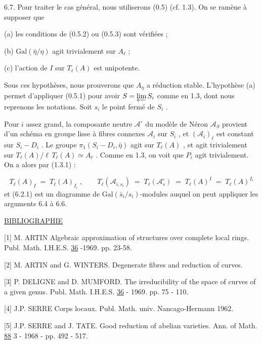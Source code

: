 6.7. Pour traiter le cas général, nous utiliserons (0.5) (cf. 1.3). On se ramène à supposer que



(a) les conditions de (0.5.2) ou (0.5.3)  sont vérifiées ;

(b) $\mathrm{Gal}(\bar{\eta}/\eta)$  agit trivialement sur  $A_\ell$ ;

(c) l'action de  $I$  sur  $T_\ell(A)$  est unipotente.

Sous ces hypothèses, nous prouverons que  $A_\eta$  a réduction stable. L'hypothèse (a) permet d'appliquer (0.5.1) pour avoir  $S = \varprojlim S_i$  comme en 1.3, dont nous reprenons les notations. Soit  $s_i$  le point fermé de  $S_i$ .

Pour  $i$  assez grand, la composante neutre  $\mathcal{A}^\circ$  du modèle de Néron  $\mathcal{A}_S$  provient d'un schéma en groupe lisse à fibres connexes  $\mathcal{A}_i$  sur  $S_i$ , et  $(\mathcal{A}_i)_\ell$  est constant sur  $S_i - D_i$ . Le groupe  $\pi_1(S_i - D_i , \bar{\eta})$  agit sur  $T_\ell(A)$ , et agit trivialement sur  $T_\ell(A)/\ell\, T_\ell(A) \simeq A_\ell$ . Comme en 1.3, on voit que  $P_i$  agit trivialement. On a alors par (1.3.1) :

\begin{equation*}
T_\ell(A)_I \;=\; T_\ell(A)_{I_i} \;,\qquad T_\ell(\mathcal{A}_{i,s_i}) \;=\; T_\ell(\mathcal{A}^\circ_s) \;=\; T_\ell(A)^I \;=\; T_\ell(A)^{I_i}
\end{equation*}
et (6.2.1) est un diagramme de  $\mathrm{Gal}(\bar{s}_i/s_i)$-modules auquel on peut appliquer les arguments 6.4 à 6.6.




\underline{BIBLIOGRAPHIE}

[1]	M. ARTIN	Algebraic approximation of structures over complete local rings. Publ. Math. I.H.E.S. \underline{36} -1969. pp. 23-58.

[2]	M. ARTIN and G. WINTERS. Degenerate fibres and reduction of curves.

[3]	P. DELIGNE and D. MUMFORD. The irreducibility of the space of curves of a given genus. Publ. Math. I.H.E.S. \underline{36} - 1969. pp. 75 - 110.

[4]	J.P. SERRE	Corps locaux. Publ. Math. univ. Nancago-Hermann 1962.

[5]	J.P. SERRE and J. TATE. Good reduction of abelian varieties. Ann. of Math. \underline{88} 3 - 1968 - pp. 492 - 517.
